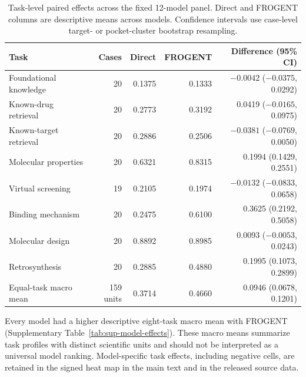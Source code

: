 \documentclass{article}
\begin{document}
\begin{table}[htbp]
\centering
\small
\caption{Task-level paired effects across the fixed 12-model panel. Direct and FROGENT columns are descriptive means across models. Confidence intervals use case-level target- or pocket-cluster bootstrap resampling.}
\label{tab:sup-task-effects}
\begin{tabular}{lrrrr}
\toprule
Task & Cases & Direct & FROGENT & Difference (95\% CI) \\
\midrule
Foundational knowledge & 20 & 0.1375 & 0.1333 & $-0.0042$ ($-0.0375$, 0.0292) \\
Known-drug retrieval & 20 & 0.2773 & 0.3192 & 0.0419 ($-0.0165$, 0.0975) \\
Known-target retrieval & 20 & 0.2886 & 0.2506 & $-0.0381$ ($-0.0769$, 0.0050) \\
Molecular properties & 20 & 0.6321 & 0.8315 & 0.1994 (0.1429, 0.2551) \\
Virtual screening & 19 & 0.2105 & 0.1974 & $-0.0132$ ($-0.0833$, 0.0658) \\
Binding mechanism & 20 & 0.2475 & 0.6100 & 0.3625 (0.2192, 0.5058) \\
Molecular design & 20 & 0.8892 & 0.8985 & 0.0093 ($-0.0053$, 0.0243) \\
Retrosynthesis & 20 & 0.2885 & 0.4880 & 0.1995 (0.1073, 0.2899) \\
\midrule
Equal-task macro mean & 159 units & 0.3714 & 0.4660 & 0.0946 (0.0678, 0.1201) \\
\bottomrule
\end{tabular}
\end{table}

Every model had a higher descriptive eight-task macro mean with FROGENT (Supplementary Table~\ref{tab:sup-model-effects}). These macro means summarize task profiles with distinct scientific units and should not be interpreted as a universal model ranking. Model-specific task effects, including negative cells, are retained in the signed heat map in the main text and in the released source data.
\end{document}
